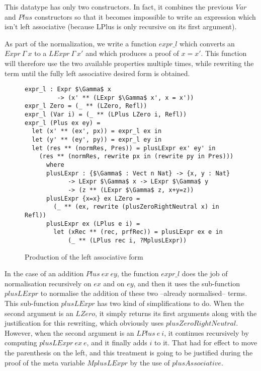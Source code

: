 This datatype has only two constructors. In fact, it combines the previous $Var$ and $Plus$ constructors so that it becomes impossible to write an expression which isn't left associative (because LPlus is only recursive on its first argument).
 
As part of the normalization, we write a function $expr\_l$ which converts an $Expr\ \Gamma\ x$ to a $LExpr\ \Gamma\ x'$ and which produces a proof of $x=x'$. This function will therefore use the two available properties multiple times, while rewriting the term until the fully left associative desired form is obtained.

\begin{figure}[H]
\figrule
\begin{center}
\begin{lstlisting}
expr_l : Expr $\Gamma$ x 
         -> (x' ** (LExpr $\Gamma$ x', x = x'))
expr_l Zero = (_ ** (LZero, Refl))
expr_l (Var i) = (_ ** (LPlus LZero i, Refl))
expr_l (Plus ex ey) = 
  let (x' ** (ex', px)) = expr_l ex in
  let (y' ** (ey', py)) = expr_l ey in
  let (res ** (normRes, Pres)) = plusLExpr ex' ey' in
    (res ** (normRes, rewrite px in (rewrite py in Pres)))
      where 
      plusLExpr : {$\Gamma$ : Vect n Nat} -> {x, y : Nat} 
            -> LExpr $\Gamma$ x -> LExpr $\Gamma$ y  
            -> (z ** (LExpr $\Gamma$ z, x+y=z))
      plusLExpr {x=x} ex LZero =
        (_ ** (ex, rewrite (plusZeroRightNeutral x) in Refl))            
      plusLExpr ex (LPlus e i) =
        let (xRec ** (rec, prfRec)) = plusLExpr ex e in
            (_ ** (LPlus rec i, ?MplusLExpr))

\end{lstlisting}
\end{center}
\caption{Production of the left associative form}
\figrule
\end{figure}
In the case of an addition $Plus\ ex\ ey$, the function $expr\_l$ does the job of normalisation recursively on $ex$ and on $ey$, and then it uses the sub-function $plusLExpr$ to normalise the addition of these two --already normalised-- terms. This sub-function $plusLExpr$ has two kind of simplifications to do. When the second argument is an $LZero$, it simply returns its first arguments along with the justification for this rewriting, which obviously uses $plusZeroRightNeutral$. However, when the second argument is an $LPlus\ e\ i$, it continues recursively by computing $plusLExpr\ ex\ e$, and it finally adds $i$ to it. That had for effect to move the parenthesis on the left, and this treatment is going to be justified during the proof of the meta variable $MplusLExpr$ by the use of $plusAssociative$.

